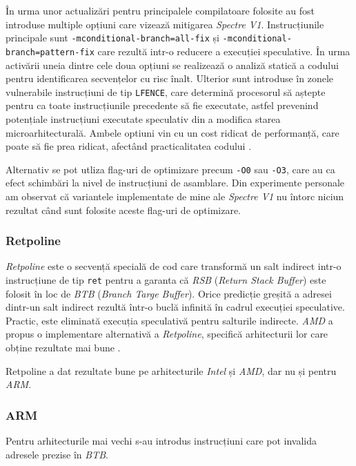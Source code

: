 În urma unor actualizări pentru principalele compilatoare folosite au fost
introduse multiple opțiuni care vizează mitigarea \emph{Spectre V1}.
Instrucțiunile principale sunt \texttt{-mconditional-branch=all-fix} și
\texttt{-mconditional-branch=pattern-fix} care rezultă intr-o reducere a 
execuției speculative. În urma activării uneia dintre cele doua opțiuni
se realizează o analiză statică a codului pentru identificarea secvențelor 
cu risc înalt. Ulterior sunt introduse în zonele vulnerabile instrucțiuni de 
tip \texttt{LFENCE}, care determină procesorul să aștepte pentru ca toate 
instrucțiunile precedente să fie executate, astfel prevenind potențiale 
instrucțiuni executate speculativ din a modifica starea microarhitecturală.
Ambele optiuni vin cu un cost ridicat de performanță, care poate să fie 
prea ridicat, afectând practicalitatea codului \cite{v1_mitigations}.

Alternativ se pot utliza flag-uri de optimizare precum \texttt{-O0} sau 
\texttt{-O3}, care au ca efect schimbări la nivel de instrucțiuni de asamblare.
Din experimente personale am observat că variantele implementate de mine
ale \emph{Spectre V1} nu întorc niciun rezultat când sunt folosite aceste 
flag-uri de optimizare.

\subsubsection{Retpoline}

\emph{Retpoline} este o secvență specială de cod care transformă un salt 
indirect intr-o instrucțiune de tip \texttt{ret} pentru a garanta că 
\emph{RSB} (\emph{Return Stack Buffer}) este folosit în loc de
\emph{BTB} (\emph{Branch Targe Buffer}). Orice predicție greșită a
adresei dintr-un salt indirect rezultă într-o buclă infinită în 
cadrul execuției speculative. Practic, este eliminată execuția
speculativă pentru salturile indirecte. \emph{AMD} a propus o
implementare alternativă a \emph{Retpoline}, specifică arhitecturii
lor care obține rezultate mai bune \cite{bhi_spectre_2022}. 

Retpoline a dat rezultate bune pe arhitecturile \emph{Intel} și
\emph{AMD}, dar nu și pentru \emph{ARM}.

\subsubsection{ARM}

Pentru arhitecturile mai vechi s-au introdus instrucțiuni care 
pot invalida adresele prezise în \emph{BTB}.

